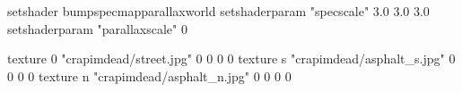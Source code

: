 setshader bumpspecmapparallaxworld
setshaderparam "specscale" 3.0 3.0 3.0
setshaderparam "parallaxscale" 0

texture 0 "crapimdead/street.jpg" 0 0 0 0
texture s "crapimdead/asphalt_s.jpg" 0 0 0 0
texture n "crapimdead/asphalt_n.jpg" 0 0 0 0
